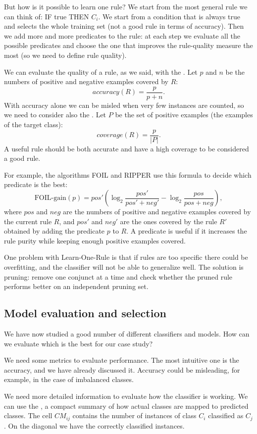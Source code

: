 But how is it possible to learn one rule? We start from the most general rule we can think of: IF true THEN $C_i$. We start from a condition that is always true and selects the whole training set (not a good rule in terms of accuracy). Then we add more and more predicates to the rule: at each step we evaluate all the possible predicates and choose the one that improves the rule-quality measure the most (so we need to define rule quality).

We can evaluate the quality of a rule, as we said, with the . Let $p$ and $n$ be the numbers of positive and negative examples covered by $R$:
\[
  accuracy(R) = \frac{p}{p + n}.
\]
With accuracy alone we can be misled when very few instances are counted, so we need to consider also the . Let $P$ be the set of positive examples (the examples of the target class):
\[
  coverage(R) = \frac{p}{|P|}.
\]
A useful rule should be both accurate and have a high coverage to be considered a good rule.

For example, the algorithms FOIL and RIPPER use this formula to decide which predicate is the best:
\[
  \text{FOIL-gain}(p) = pos' \left( \log_2 \frac{pos'}{pos' + neg'} - \log_2 \frac{pos}{pos + neg} \right),
\]
where $pos$ and $neg$ are the numbers of positive and negative examples covered by the current rule $R$, and $pos'$ and $neg'$ are the ones covered by the rule $R'$ obtained by adding the predicate $p$ to $R$.
A predicate is useful if it increases the rule purity while keeping enough positive examples covered.

One problem with Learn-One-Rule is that if rules are too specific there could be overfitting, and the classifier will not be able to generalize well. The solution is pruning: remove one conjunct at a time and check whether the pruned rule performs better on an independent pruning set.

\subsection{Model evaluation and selection}
We have now studied a good number of different classifiers and models. How can we evaluate which is the best for our case study?

We need some metrics to evaluate performance. The most intuitive one is the accuracy, and we have already discussed it. Accuracy could be misleading, for example, in the case of imbalanced classes.

We need more detailed information to evaluate how the classifier is working. We can use the , a compact summary of how actual classes are mapped to predicted classes. The cell $CM_{ij}$ contains the number of instances of class $C_i$ classified as $C_j$. On the diagonal we have the correctly classified instances.

